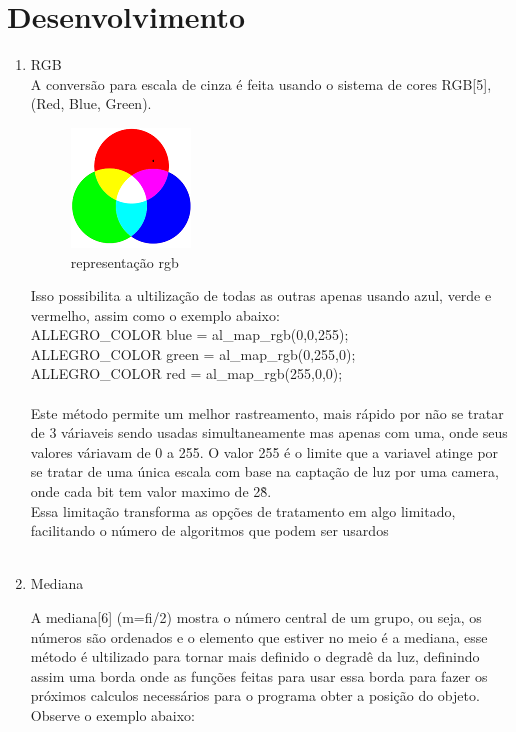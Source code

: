 \documentclass[a4paper]{article}
\begin{document}
\section*{Desenvolvimento}
\begin{enumerate}

\item{RGB}\\

A conversão para escala de cinza é feita usando o sistema de cores RGB[5], (Red, Blue, Green). \\

\begin{figure}[!htb]
\centering
\includegraphics{peq.png}
\caption{representação rgb}
\label{Rotulo}
\end{figure}


Isso possibilita a ultilização de todas as outras apenas usando azul, verde e vermelho, assim como o exemplo abaixo:\\

ALLEGRO\_COLOR blue = al\_map\_rgb(0,0,255); \\
ALLEGRO\_COLOR green = al\_map\_rgb(0,255,0); \\
ALLEGRO\_COLOR red = al\_map\_rgb(255,0,0); \\
\\
Este método permite um melhor rastreamento, mais rápido por não se tratar de 3 váriaveis sendo usadas
simultaneamente mas apenas com uma, onde seus valores váriavam de 0 a 255. O valor 255 é o limite que a variavel atinge
por se tratar de uma única escala com base na captação de luz por uma camera, onde cada bit tem valor maximo de 2\^8.\\
Essa limitação transforma as opções de tratamento em algo limitado, facilitando o número de algoritmos que podem ser
usardos \\
\\
\item{Mediana}


A mediana[6] (m=fi/2) mostra o número central de um grupo, ou seja, os números são ordenados e o elemento que estiver no meio é a mediana, esse método é ultilizado para tornar mais definido o degradê da luz, definindo assim uma borda onde as funções feitas para usar essa borda para fazer os próximos calculos necessários para o programa obter a posição do objeto. Observe o exemplo abaixo: \\



\end{enumerate}
\end{document}
